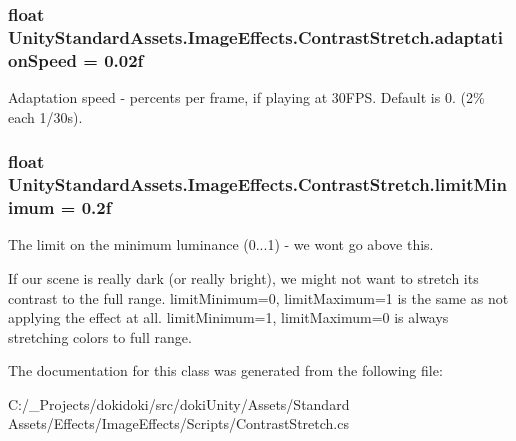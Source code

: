 \subsubsection[{\texorpdfstring{adaptation\+Speed}{adaptationSpeed}}]{\setlength{\rightskip}{0pt plus 5cm}float Unity\+Standard\+Assets.\+Image\+Effects.\+Contrast\+Stretch.\+adaptation\+Speed = 0.\+02f}\hypertarget{class_unity_standard_assets_1_1_image_effects_1_1_contrast_stretch_ab81f2962fed7bf78dc6d065d815fc195}{}\label{class_unity_standard_assets_1_1_image_effects_1_1_contrast_stretch_ab81f2962fed7bf78dc6d065d815fc195}
Adaptation speed -\/ percents per frame, if playing at 30\+F\+PS. Default is 0. (2\% each 1/30s). 
\subsubsection[{\texorpdfstring{limit\+Minimum}{limitMinimum}}]{\setlength{\rightskip}{0pt plus 5cm}float Unity\+Standard\+Assets.\+Image\+Effects.\+Contrast\+Stretch.\+limit\+Minimum = 0.\+2f}\hypertarget{class_unity_standard_assets_1_1_image_effects_1_1_contrast_stretch_af7b86c130f65b4b1f36fff63266a9cf6}{}\label{class_unity_standard_assets_1_1_image_effects_1_1_contrast_stretch_af7b86c130f65b4b1f36fff63266a9cf6}


The limit on the minimum luminance (0...1) -\/ we won\textquotesingle{}t go above this. 

If our scene is really dark (or really bright), we might not want to stretch its contrast to the full range. limit\+Minimum=0, limit\+Maximum=1 is the same as not applying the effect at all. limit\+Minimum=1, limit\+Maximum=0 is always stretching colors to full range. 

The documentation for this class was generated from the following file\+:\begin{DoxyCompactItemize}
\item 
C\+:/\+\_\+\+Projects/dokidoki/src/doki\+Unity/\+Assets/\+Standard Assets/\+Effects/\+Image\+Effects/\+Scripts/Contrast\+Stretch.\+cs\end{DoxyCompactItemize}

